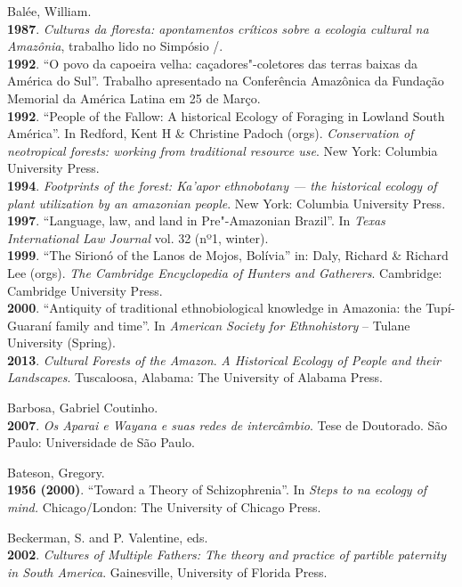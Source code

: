 \begin{Parskip}
Balée, William.\\
\textbf{1987}. \emph{Culturas da floresta: apontamentos críticos sobre a
ecologia cultural na Amazônia}, trabalho lido no Simpósio /.\\
\textbf{1992}. ``O povo da capoeira velha: caçadores"-coletores das
terras baixas da América do Sul''. Trabalho apresentado na Conferência
Amazônica da Fundação Memorial da América Latina em 25 de Março.\\
\textbf{1992}. ``People of the Fallow: A historical Ecology of Foraging
in Lowland South América''. In Redford, Kent H \& Christine Padoch
(orgs). \emph{Conservation of neotropical forests: working from
traditional resource use}. New York: Columbia University Press.\\
\textbf{1994}. \emph{Footprints of the forest: Ka'apor ethnobotany ---
the historical ecology of plant utilization by an amazonian people}. New
York: Columbia University Press.\\
\textbf{1997}. ``Language, law, and land in Pre"-Amazonian Brazil''. In
\emph{Texas International Law Journal} vol. 32 (nº1, winter).\\
\textbf{1999}. ``The Sirionó of the Lanos de Mojos, Bolívia'' in: Daly, Richard
\& Richard Lee (orgs). \emph{The Cambridge Encyclopedia of Hunters and
Gatherers}. Cambridge: Cambridge University Press.\\
\textbf{2000}. ``Antiquity of traditional ethnobiological knowledge in
Amazonia: the Tupí-Guaraní family and time''. In \emph{American Society
for Ethnohistory} -- Tulane University (Spring).\\
\textbf{2013}. \emph{Cultural Forests of the Amazon}. \emph{A Historical
Ecology of People and their Landscapes}. Tuscaloosa, Alabama: The
University of Alabama Press. 

Barbosa, Gabriel Coutinho.\\
\textbf{2007}. \emph{Os Aparai e Wayana e suas redes de intercâmbio}.
Tese de Doutorado. São Paulo: Universidade de São Paulo.

Bateson, Gregory.\\
\textbf{1956 (2000)}. ``Toward a Theory of Schizophrenia''. In
\emph{Steps to na ecology of mind.} Chicago/London: The University of
Chicago Press.

Beckerman, S. and P. Valentine, eds.\\
\textbf{2002}. \emph{Cultures of Multiple Fathers: The theory and
practice of partible paternity in South America}. Gainesville,
University of Florida Press.


\end{Parskip}
